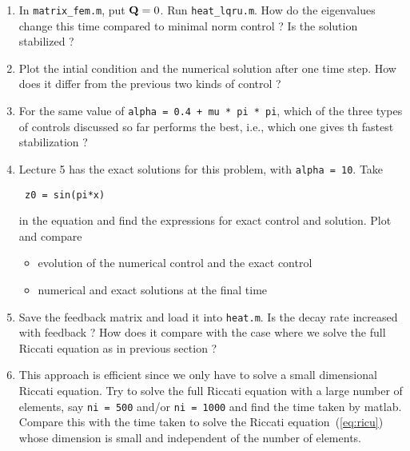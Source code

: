 \documentclass[12pt]{article}
\begin{document}
\begin{enumerate}

\item In {\tt matrix\_fem.m}, put ${\mathbf Q} = 0$. Run {\tt heat\_lqru.m}. How do the eigenvalues change this time  compared to minimal norm control ? Is the solution stabilized ?

\item Plot the intial condition and the numerical solution after one time step. How does it differ from the previous two kinds of control ?

\item For the same value of {\tt alpha = 0.4 + mu * pi * pi}, which of the three types of controls discussed so far performs the best, i.e., which one gives th fastest stabilization ?

\item Lecture 5 has the exact solutions for this problem, with {\tt alpha = 10}. Take 
\begin{lstlisting}
 z0 = sin(pi*x) 
\end{lstlisting}
in the equation and find the expressions for exact control and solution. Plot and compare 
\begin{itemize}
 \item evolution of the numerical control and the exact control 
 \item numerical and exact solutions at the final time
\end{itemize}

\item Save the feedback matrix and load it into {\tt heat.m}. Is the decay rate increased with feedback ? How does it compare with the case where we solve the full Riccati equation as in previous section ?

\item This approach is efficient since we only have to solve a small dimensional Riccati equation. Try to solve the full Riccati equation with a large number of elements, say {\tt ni = 500} and/or {\tt ni = 1000} and find the time taken by matlab. Compare this with the time taken to solve the Riccati equation~(\ref{eq:ricu}) whose dimension is small and independent of the number of elements.
\end{enumerate}

\pagebreak
\end{document}
